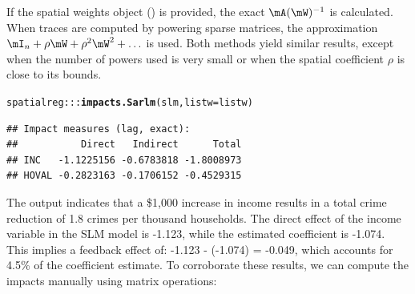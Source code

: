 \documentclass[english,12pt]{book}\usepackage[]{graphicx}\usepackage[]{xcolor}
\makeatletter
\newcommand{\hlopt}[1]{\textcolor[rgb]{0,0,0}{#1}}%
\newcommand{\hlstd}[1]{\textcolor[rgb]{0.345,0.345,0.345}{#1}}%
\newcommand{\hlkwc}[1]{\textcolor[rgb]{0.333,0.667,0.333}{#1}}%
\newcommand{\hlkwd}[1]{\textcolor[rgb]{0.737,0.353,0.396}{\textbf{#1}}}%
\newenvironment{kframe}{%
 \def\at@end@of@kframe{}%
 \ifinner\ifhmode%
  \def\at@end@of@kframe{\end{minipage}}%
  \begin{minipage}{\columnwidth}%
 \fi\fi%
 \def\FrameCommand##1{\hskip\@totalleftmargin \hskip-\fboxsep
 \colorbox{shadecolor}{##1}\hskip-\fboxsep
     \hskip-\linewidth \hskip-\@totalleftmargin \hskip\columnwidth}%
 \MakeFramed {\advance\hsize-\width
   \@totalleftmargin\z@ \linewidth\hsize
   \@setminipage}}%
 {\par\unskip\endMakeFramed%
 \at@end@of@kframe}
\newenvironment{knitrout}{}{} %
\makeatother
\begin{document}
If the spatial weights object () is provided, the exact $\mA(\mW)^{-1}$ is calculated. When traces are computed by powering sparse matrices, the approximation $\mI_n + \rho\mW + \rho^2\mW^2 + \ldots$ is used. Both methods yield similar results, except when the number of powers used is very small or when the spatial coefficient $\rho$ is close to its bounds.

\begin{knitrout}
\color{fgcolor}\begin{kframe}
\begin{alltt}
\hlstd{spatialreg}\hlopt{:::}\hlkwd{impacts.Sarlm}\hlstd{(slm,} \hlkwc{listw} \hlstd{= listw)}
\end{alltt}
\begin{verbatim}
## Impact measures (lag, exact):
##           Direct   Indirect      Total
## INC   -1.1225156 -0.6783818 -1.8008973
## HOVAL -0.2823163 -0.1706152 -0.4529315
\end{verbatim}
\end{kframe}
\end{knitrout}

The output indicates that a \$1,000 increase in income results in a total crime reduction of 1.8 crimes per thousand households. The direct effect of the income variable in the SLM model is -1.123, while the estimated coefficient is -1.074. This implies a feedback effect of: -1.123 - (-1.074) = -0.049, which accounts for 4.5\% of the coefficient estimate. To corroborate these results, we can compute the impacts manually using matrix operations:
\end{document}
